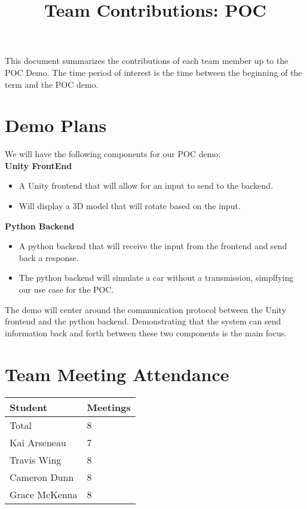 \documentclass{article}
\title{Team Contributions: POC\\\progname}
\author{\authname}
\date{}
\begin{document}
\maketitle

This document summarizes the contributions of each team member up to the POC
Demo.  The time period of interest is the time between the beginning of the term
and the POC demo.

\section{Demo Plans}

We will have the following components for our POC demo:\\

\noindent
\textbf{Unity FrontEnd}
\begin{itemize}
  \item A Unity frontend that will allow for an input to send to the backend.
  \item Will display a 3D model that will rotate based on the input.
\end{itemize}
\noindent
\textbf{Python Backend}
\begin{itemize}
  \item A python backend that will receive the input from the frontend and send back a response.
  \item The python backend will simulate a car without a transmission, simplfying our use case for the POC.
\end{itemize}
\noindent
The demo will center around the communication protocol between the Unity frontend and the python backend.
Demonstrating that the system can send information back and forth between these two components is the main focus.

\section{Team Meeting Attendance}

\begin{table}[H]
\centering
\begin{tabular}{ll}
\toprule
\textbf{Student} & \textbf{Meetings}\\
\midrule
Total & 8\\
Kai Arseneau & 7\\
Travis Wing & 8\\
Cameron Dunn & 8\\
Grace McKenna & 8\\
\bottomrule
\end{tabular}
\end{table}
\end{document}
